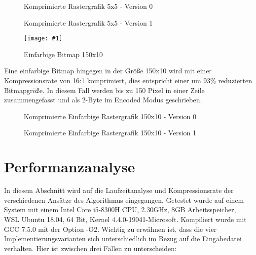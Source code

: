 \documentclass[course=erap]{aspdoc}
\newcommand{\hexdump}[2]{
 \begin{figure}[H]
   \small
   
   \vspace*{-5mm}
   \caption{#2}
 \end{figure}
}
\newcommand{\image}[3]{
 \begin{figure}[H]
   \texttt{[image: \#1]}
 \centering
   \caption{#2}
 \end{figure}
}
\begin{document}
\hexdump{res/example_28_5x5_compressed.txt}{Komprimierte Rastergrafik 5x5 - Version 0}
\hexdump{res/example_28_5x5_compressed_V1.txt}{Komprimierte Rastergrafik 5x5 - Version 1}
\image{./res/pink_28_150x10}{Einfarbige Bitmap 150x10}{0.9\textwidth}
Eine einfarbige Bitmap hingegen in der Größe 150x10 wird mit einer Kompressionsrate von 16:1 komprimiert, dies entspricht einer um 93\% reduzierten Bitmapgröße. In diesem Fall werden bis zu 150 Pixel in einer Zeile zusammengefasst und als 2-Byte im Encoded Modus geschrieben.
\hexdump{res/pink_28_150x10_compressed.txt}{Komprimierte Einfarbige Rastergrafik 150x10 - Version 0}
\hexdump{res/pink_28_150x10_compressed_V1.txt}{Komprimierte Einfarbige Rastergrafik 150x10 - Version 1}


\section{Performanzanalyse}
In diesem Abschnitt wird auf die Laufzeitanalyse und Kompressionsrate der verschiedenen Ansätze des Algorithmus eingegangen. Getestet wurde auf einem System mit einem Intel Core i5-8300H CPU, 2.30GHz, 8GB Arbeitsspeicher, WSL Ubuntu 18.04, 64 Bit, Kernel 4.4.0-19041-Microsoft. Kompiliert wurde mit GCC 7.5.0 mit der Option -O2.\newline
Wichtig zu erwähnen ist, dass die vier Implementierungsvarianten sich unterschiedlich im Bezug auf die Eingabedatei verhalten. Hier ist zwischen drei Fällen zu unterscheiden:
\end{document}
